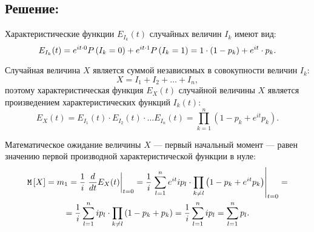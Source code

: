 \subsection*{Решение:}

Характеристические функции $E_{I_k}(t)$ случайных величин $I_k$ имеют вид:
\begin{equation}
    E_{I_k}(t)
    = e^{it \cdot 0} P \left ( I_k = 0 \right ) + e^{it \cdot 1} P \left ( I_k = 1 \right )
    = 1 \cdot ( 1 - p_k ) + e^{it} \cdot p_k .
\end{equation}

Случайная величина $X$ является суммой независимых в совокупности величин $I_k$:
\begin{equation}
    X = I_1 + I_2 + \dots + I_n,
\end{equation}
поэтому характеристическая функция $E_X(t)$ случайной величины $X$ является произведением характеристических функций $I_k(t)$:
\begin{equation}
    E_X(t)
    = E_{I_1}(t) \cdot E_{I_2}(t) \cdot \dots E_{I_n}(t)
    = \prod_{k=1}^n \left ( 1 - p_k + e^{it} p_k \right ).
\end{equation}

Математическое ожидание величины $X$ --- первый начальный момент --- равен значению первой производной характеристической функции в нуле:
\begin{multline}
    \mathtt{M} \left [ X \right ] = m_1
    = \frac{1}{i} \left . \frac{d}{dt} E_X(t) \right |_{t=0}
    = \frac{1}{i} \left . \sum_{l=1}^n e^{it} i p_l \cdot \prod_{k \neq l} \left ( 1 - p_k + e^{it} p_k \right ) \right |_{t=0} = \\
    = \frac{1}{i}  \sum_{l=1}^n i p_l \cdot \prod_{k \neq l} \left ( 1 - p_k + p_k \right )
    = \frac{1}{i} \sum_{l=1}^n i p_l
    = \sum_{l=1}^n p_l .
\end{multline}

